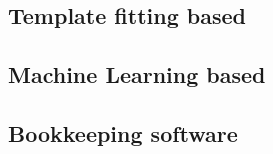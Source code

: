 \subsection{Template fitting based}
\label{sec:method:template}


\subsection{Machine Learning based}
\label{sec:method:machine_learning}

\subsection{Bookkeeping software}
\label{sec:method:rail_project}
